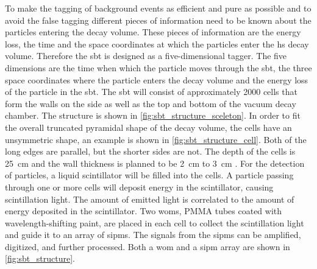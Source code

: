 To make the tagging of background events as efficient and pure as possible and to avoid the false tagging different pieces of information need to be known about the particles entering the decay volume.
These pieces of information are the energy loss, the time and the space coordinates at which the particles enter the \ac{hs} decay volume.
Therefore the \ac{sbt} is designed as a five-dimensional tagger.
The five dimensions are the time when which the particle moves through the \ac{sbt}, the three space coordinates where the particle enters the decay volume and the energy loss of the particle in the \ac{sbt}.
The \ac{sbt} will consist of approximately 2000 cells that form the walls on the side as well as the top and bottom of the vacuum decay chamber.
The structure is shown in \autoref{fig:sbt_structure_sceleton}.
In order to fit the overall truncated pyramidal shape of the decay volume, the cells have an unsymmetric shape, an example is shown in \autoref{fig:sbt_structure_cell}.
Both of the long edges are parallel, but the shorter sides are not.
The depth of the cells is \SI{25}{\centi\meter} and the wall thickness is planned to be \SI{2}{\centi\meter} to \SI{3}{\centi\meter} \cite{strucural_design}.
For the detection of particles, a liquid scintillator will be filled into the cells.
A particle passing through one or more cells will deposit energy in the scintillator, causing scintillation light.
The amount of emitted light is correlated to the amount of energy deposited in the scintillator.
Two \acp{wom}, PMMA tubes coated with wavelength-shifting paint, are placed in each cell to collect the scintillation light and guide it to an array of \acp{sipm}.
The signals from the \acp{sipm} can be amplified, digitized, and further processed.
Both a \ac{wom} and a \ac{sipm} array are shown in \autoref{fig:sbt_structure}.
